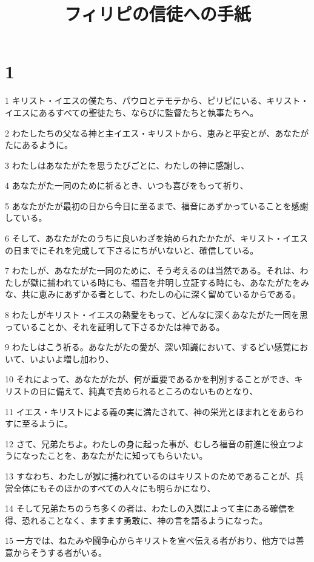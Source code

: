

\title{フィリピの信徒への手紙}


\chapter{1}

\par 1 キリスト・イエスの僕たち、パウロとテモテから、ピリピにいる、キリスト・イエスにあるすべての聖徒たち、ならびに監督たちと執事たちへ。
\par 2 わたしたちの父なる神と主イエス・キリストから、恵みと平安とが、あなたがたにあるように。
\par 3 わたしはあなたがたを思うたびごとに、わたしの神に感謝し、
\par 4 あなたがた一同のために祈るとき、いつも喜びをもって祈り、
\par 5 あなたがたが最初の日から今日に至るまで、福音にあずかっていることを感謝している。
\par 6 そして、あなたがたのうちに良いわざを始められたかたが、キリスト・イエスの日までにそれを完成して下さるにちがいないと、確信している。
\par 7 わたしが、あなたがた一同のために、そう考えるのは当然である。それは、わたしが獄に捕われている時にも、福音を弁明し立証する時にも、あなたがたをみな、共に恵みにあずかる者として、わたしの心に深く留めているからである。
\par 8 わたしがキリスト・イエスの熱愛をもって、どんなに深くあなたがた一同を思っていることか、それを証明して下さるかたは神である。
\par 9 わたしはこう祈る。あなたがたの愛が、深い知識において、するどい感覚において、いよいよ増し加わり、
\par 10 それによって、あなたがたが、何が重要であるかを判別することができ、キリストの日に備えて、純真で責められるところのないものとなり、
\par 11 イエス・キリストによる義の実に満たされて、神の栄光とほまれとをあらわすに至るように。
\par 12 さて、兄弟たちよ。わたしの身に起った事が、むしろ福音の前進に役立つようになったことを、あなたがたに知ってもらいたい。
\par 13 すなわち、わたしが獄に捕われているのはキリストのためであることが、兵営全体にもそのほかのすべての人々にも明らかになり、
\par 14 そして兄弟たちのうち多くの者は、わたしの入獄によって主にある確信を得、恐れることなく、ますます勇敢に、神の言を語るようになった。
\par 15 一方では、ねたみや闘争心からキリストを宣べ伝える者がおり、他方では善意からそうする者がいる。
